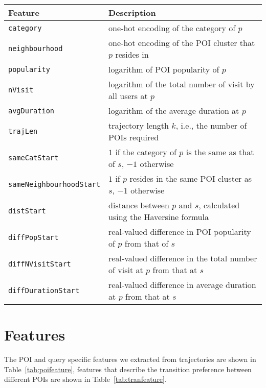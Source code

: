 \documentclass[twocolumn,9pt]{extarticle}
\begin{document}
\begin{table*}[ht]
\caption{Features of POI $p$ with respect to query $(s,k)$}
\label{tab:poifeature}
\centering
\setlength{\tabcolsep}{10pt} %
\begin{tabular}{l|l} \hline
\textbf{Feature}  & \textbf{Description} \\ \hline
\texttt{category}               & one-hot encoding of the category of $p$ \\
\texttt{neighbourhood}          & one-hot encoding of the POI cluster that $p$ resides in \\
\texttt{popularity}             & logarithm of POI popularity of $p$ \\
\texttt{nVisit}                 & logarithm of the total number of visit by all users at $p$ \\
\texttt{avgDuration}            & logarithm of the average duration at $p$ \\ \hline
\texttt{trajLen}                & trajectory length $k$, i.e., the number of POIs required \\
\texttt{sameCatStart}           & $1$ if the category of $p$ is the same as that of $s$, $-1$ otherwise \\
\texttt{sameNeighbourhoodStart} & $1$ if $p$ resides in the same POI cluster as $s$, $-1$ otherwise \\
\texttt{distStart}              & distance between $p$ and $s$, calculated using the Haversine formula \\
\texttt{diffPopStart}           & real-valued difference in POI popularity of $p$ from that of $s$ \\
\texttt{diffNVisitStart}        & real-valued difference in the total number of visit at $p$ from that at $s$ \\
\texttt{diffDurationStart}      & real-valued difference in average duration at $p$ from that at $s$ \\
\hline
\end{tabular}
\end{table*}


\section{Features}
\label{sec:feature}

The POI and query specific features we extracted from trajectories are shown in Table~\ref{tab:poifeature},
features that describe the transition preference between different POIs are shown in Table~\ref{tab:tranfeature}.
\end{document}
